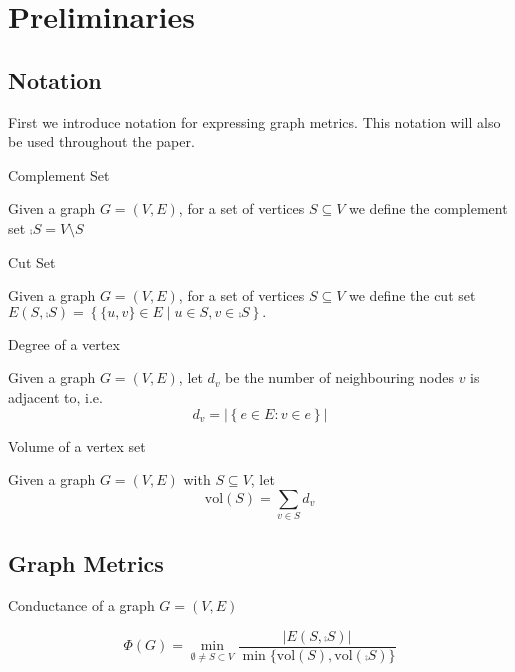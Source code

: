\section{Preliminaries}
\label{Prelims}

\subsection{Notation}

First we introduce notation for expressing graph metrics. This notation will also be used throughout the paper. %

\begin{definition}
	Complement Set

	\noindent
	Given a graph $G = (V, E)$, for a set of vertices $S \subseteq V$ we define the complement set $\comp{S} = V \setminus S$
\end{definition}

\begin{definition}
	Cut Set

	\noindent
	Given a graph $G = (V, E)$, for a set of vertices $S \subseteq V$ we define the cut set $ E(S, \comp{S}) = \left\{\{u, v\} \in E \mid u \in S, v \in \comp{S} \right\}.$
\end{definition}

\begin{definition}
	Degree of a vertex

	\noindent
	Given a graph $G = (V, E)$, let $d_v$ be the number of neighbouring nodes $v$ is adjacent to, i.e. $$
		d_v = |\left\{ e \in E : v \in e \right\}|
	$$
\end{definition}

\begin{definition}
	Volume of a vertex set

	\noindent
	Given a graph $G = (V, E)$ with $S \subseteq V$, let 
	$$
		\text{vol}(S) = \sum_{v \in S} d_v
	$$
\end{definition}


\subsection{Graph Metrics}

\begin{definition}
	Conductance of a graph $G = (V, E)$

	$$
		\Phi(G) = \min_{\emptyset \neq S \subset V} \frac{|E(S, \comp{S})|}{\min\{\text{vol}(S), \text{vol}(\comp{S})\}}
	$$
\end{definition}


